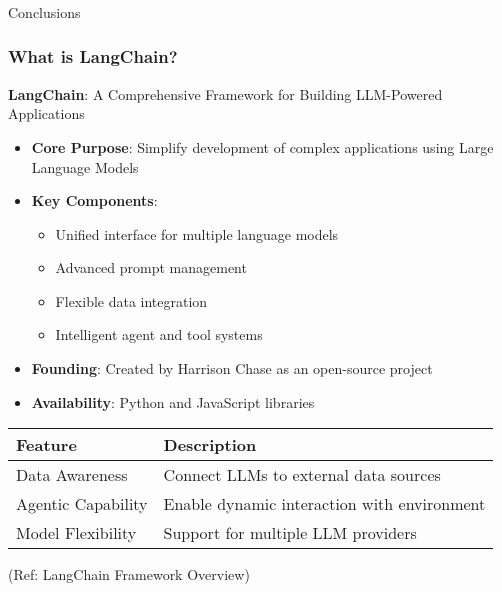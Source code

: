 \begin{frame}[fragile]\frametitle{}
\begin{center}
{\Large Conclusions}
\end{center}
\end{frame}

\begin{frame}\frametitle{What is LangChain?}

\textbf{LangChain}: A Comprehensive Framework for Building LLM-Powered Applications

\begin{itemize}
\item \textbf{Core Purpose}: Simplify development of complex applications using Large Language Models
\item \textbf{Key Components}:
    \begin{itemize}
        \item Unified interface for multiple language models
        \item Advanced prompt management
        \item Flexible data integration
        \item Intelligent agent and tool systems
    \end{itemize}
\item \textbf{Founding}: Created by Harrison Chase as an open-source project
\item \textbf{Availability}: Python and JavaScript libraries
\end{itemize}

\begin{center}
\begin{tabular}{|l|l|}
\hline
\textbf{Feature} & \textbf{Description} \\
\hline
Data Awareness & Connect LLMs to external data sources \\
Agentic Capability & Enable dynamic interaction with environment \\
Model Flexibility & Support for multiple LLM providers \\
\hline
\end{tabular}
\end{center}

{\tiny (Ref: LangChain Framework Overview)}
\end{frame}

